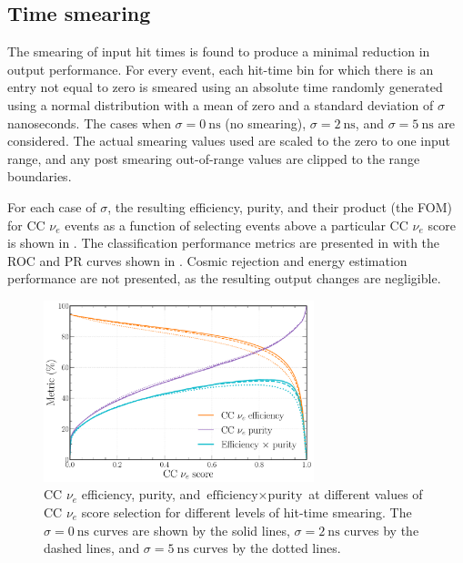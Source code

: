 \subsection{Time smearing} %
\label{sec:results_robust_time} %

The smearing of input hit times is found to produce a minimal reduction in output performance. For
every event, each hit-time bin for which there is an entry not equal to zero is smeared using an
absolute time randomly generated using a normal distribution with a mean of zero and a standard
deviation of $\sigma$ nanoseconds. The cases when $\sigma=0~\text{ns}$ (no smearing),
$\sigma=2~\text{ns}$, and $\sigma=5~\text{ns}$ are considered. The actual smearing values used are
scaled to the zero to one input range, and any post smearing out-of-range values are clipped to
the range boundaries.

For each case of $\sigma$, the resulting efficiency, purity, and their product (the FOM) for CC
$\nu_{e}$ events as a function of selecting events above a particular CC $\nu_{e}$ score is shown
in . The classification performance metrics are
presented in  with the ROC and PR curves shown in
. Cosmic rejection and energy estimation performance
are not presented, as the resulting output changes are negligible.

\begin{figure} %
    \includegraphics[width=0.7\textwidth]{diagrams/7-results/calib_time_nuel_eff_curves.pdf}
    \caption[CC $\nu_{e}$ efficiency and purity curves for different levels of hit-time smearing]
    {CC $\nu_{e}$ efficiency, purity, and $\text{efficiency}\times\text{purity}$ at different
        values of CC $\nu_{e}$ score selection for different levels of hit-time smearing. The
        $\sigma=0~\text{ns}$ curves are shown by the solid lines, $\sigma=2~\text{ns}$ curves by
        the dashed lines, and $\sigma=5~\text{ns}$ curves by the dotted lines.}
    \label{fig:calib_time_nuel_eff_curves}
\end{figure}

